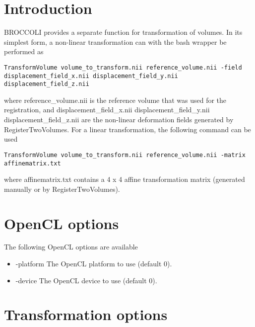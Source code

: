 \section{Introduction}

BROCCOLI provides a separate function for transformation of volumes. In its simplest form, a non-linear transformation can with the bash wrapper be performed as

\begin{verbatim}
TransformVolume volume_to_transform.nii reference_volume.nii -field 
displacement_field_x.nii displacement_field_y.nii displacement_field_z.nii
\end{verbatim}
where reference\_volume.nii is the reference volume that was used for the registration, and displacement\_field\_x.nii displacement\_field\_y.nii displacement\_field\_z.nii are the non-linear deformation fields generated by RegisterTwoVolumes. For a linear transformation, the following command can be used

\begin{verbatim}
TransformVolume volume_to_transform.nii reference_volume.nii -matrix affinematrix.txt
\end{verbatim}
where affinematrix.txt contains a 4 x 4 affine transformation matrix (generated manually or by RegisterTwoVolumes).

\section{OpenCL options}

The following OpenCL options are available

\begin{itemize}

\item -platform
\newline \newline The OpenCL platform to use (default 0).

\item -device
\newline \newline The OpenCL device to use (default 0).

\end{itemize}

\newpage

\section{Transformation options}

